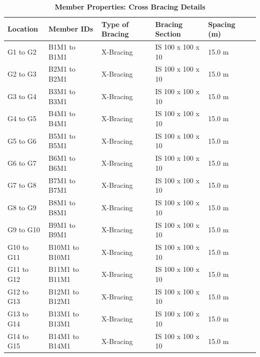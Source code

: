 \documentclass[12pt,a4paper]{report}
\numberwithin{table}{chapter}
\numberwithin{figure}{chapter}
\begin{document}
\begin{longtable}{|L{2.2cm}|L{2.2cm}|L{3.0cm}|L{2.5cm}|C{1.8cm}|C{1.8cm}|}
\caption{\textbf{Member Properties: Cross Bracing Details}}
\hline
\textbf{Location} & \textbf{Member IDs} & \textbf{Type of Bracing} & \textbf{Bracing Section} & \textbf{Spacing (m)} \\
\hline
G1 to G2 & B1M1 to B1M1 & X-Bracing & IS 100 x 100 x 10 & 15.0 m \\[6pt]
\hline
G2 to G3 & B2M1 to B2M1 & X-Bracing & IS 100 x 100 x 10 & 15.0 m \\[6pt]
\hline
G3 to G4 & B3M1 to B3M1 & X-Bracing & IS 100 x 100 x 10 & 15.0 m \\[6pt]
\hline
G4 to G5 & B4M1 to B4M1 & X-Bracing & IS 100 x 100 x 10 & 15.0 m \\[6pt]
\hline
G5 to G6 & B5M1 to B5M1 & X-Bracing & IS 100 x 100 x 10 & 15.0 m \\[6pt]
\hline
G6 to G7 & B6M1 to B6M1 & X-Bracing & IS 100 x 100 x 10 & 15.0 m \\[6pt]
\hline
G7 to G8 & B7M1 to B7M1 & X-Bracing & IS 100 x 100 x 10 & 15.0 m \\[6pt]
\hline
G8 to G9 & B8M1 to B8M1 & X-Bracing & IS 100 x 100 x 10 & 15.0 m \\[6pt]
\hline
G9 to G10 & B9M1 to B9M1 & X-Bracing & IS 100 x 100 x 10 & 15.0 m \\[6pt]
\hline
G10 to G11 & B10M1 to B10M1 & X-Bracing & IS 100 x 100 x 10 & 15.0 m \\[6pt]
\hline
G11 to G12 & B11M1 to B11M1 & X-Bracing & IS 100 x 100 x 10 & 15.0 m \\[6pt]
\hline
G12 to G13 & B12M1 to B12M1 & X-Bracing & IS 100 x 100 x 10 & 15.0 m \\[6pt]
\hline
G13 to G14 & B13M1 to B13M1 & X-Bracing & IS 100 x 100 x 10 & 15.0 m \\[6pt]
\hline
G14 to G15 & B14M1 to B14M1 & X-Bracing & IS 100 x 100 x 10 & 15.0 m \\[6pt]
\hline
\end{longtable}

\vspace{0.4em}
\noindent
\setlength{\tabcolsep}{4pt}
\setlength\LTleft{0pt}
\setlength\LTright{\fill}
\end{document}
